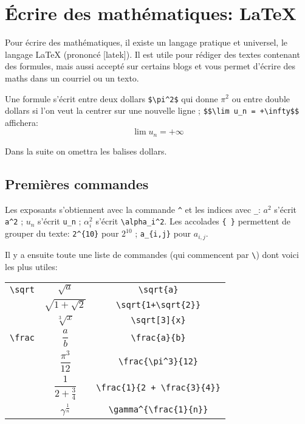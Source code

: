 \documentclass[10pt,class=article,crop=false]{standalone}
\begin{document}
\section{Écrire des mathématiques: LaTeX}

\begin{multicols}{2}


Pour écrire des mathématiques, il existe un langage pratique et universel,
le langage LaTeX (prononcé [latek]). Il est utile pour rédiger des textes contenant des formules,
mais aussi accepté sur certains blogs et vous permet d'écrire des maths
dans un courriel ou un texto.

Une formule s'écrit entre deux dollars \verb?$\pi^2$? qui donne $\pi^2$ ou entre double dollars
si l'on veut la centrer sur une nouvelle ligne ; \verb?$$\lim u_n = +\infty$$? affichera:
$$\lim u_n = + \infty$$

Dans la suite on omettra les balises dollars.

\subsection{Premières commandes}

Les exposants s'obtiennent avec la commande \verb?^? et les indices avec \verb?_?:
$a^2$ s'écrit \verb?a^2? ; $u_n$ s'écrit \verb?u_n? ; $\alpha_i^2$ s'écrit \verb?\alpha_i^2?.
Les accolades \verb?{ }? permettent de grouper du texte: \verb?2^{10}? pour $2^{10}$ ;
\verb?a_{i,j}? pour $a_{i,j}$.


Il y a ensuite toute une liste de commandes (qui commencent par \verb?\?) dont voici les plus utiles:


\begin{tabular}{ccc@{\vrule depth 1.2ex height 4ex width 0mm \ }}
	
	\verb?\sqrt?  &
	$\sqrt{a}$ & \verb?\sqrt{a}? \\
	& $\sqrt{1+\sqrt{2}}$ & \verb?\sqrt{1+\sqrt{2}}?  \\
	&  $\sqrt[3]{x}$ & \verb?\sqrt[3]{x}?  \\
	
	\verb?\frac?  &
	$\dfrac{a}{b}$ & \verb?\frac{a}{b}? \\
	& $\dfrac{\pi^3}{12}$ & \verb?\frac{\pi^3}{12}?   \\
	& $\dfrac{1}{2+ \frac{3}{4}}$ & \verb?\frac{1}{2 + \frac{3}{4}}?  \\
	& $\gamma^{\frac{1}{n}}$ & \verb?\gamma^{\frac{1}{n}}? \\
	

\end{tabular}
\end{multicols}
\end{document}
